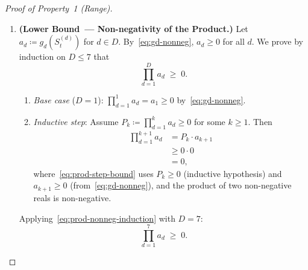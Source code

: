 \documentclass[12pt,openany]{book}
\numberwithin{equation}{chapter}
\theoremstyle{plain}
\theoremstyle{definition}
\theoremstyle{remark}
\def\mathcal#1{#1}%
\begin{document}
\begin{proof}[Proof of Property~1 (Range)]
\begin{enumerate}
  \item \textbf{(Lower Bound~--- Non-negativity of the Product.)}
        Let $a_d \coloneqq
          g_d\!\left(\mathcal{S}_t^{(d)}\right)$
        for $d \in \mathcal{D}$.
        By~\eqref{eq:gd-nonneg}, $a_d \geq 0$ for all $d$.
        We prove by induction on $D \leq 7$ that
        \begin{equation}
          \prod_{d=1}^{D} a_d \;\geq\; 0.
          \label{eq:prod-nonneg-induction}
        \end{equation}
        \begin{enumerate}
          \item \emph{Base case} ($D = 1$):
                $\prod_{d=1}^{1} a_d = a_1 \geq 0$
                by~\eqref{eq:gd-nonneg}.
          \item \emph{Inductive step}: Assume
                $P_k \coloneqq \prod_{d=1}^{k} a_d \geq 0$
                for some $k \geq 1$.
                Then
                \begin{align}
                  \prod_{d=1}^{k+1} a_d
                    &= P_k \cdot a_{k+1}
                    \label{eq:prod-step} \\
                    &\geq 0 \cdot 0
                    \label{eq:prod-step-bound} \\
                    &= 0,
                    \label{eq:prod-step-zero}
                \end{align}
                where~\eqref{eq:prod-step-bound} uses
                $P_k \geq 0$ (inductive hypothesis) and
                $a_{k+1} \geq 0$ (from~\eqref{eq:gd-nonneg}),
                and the product of two non-negative reals is
                non-negative.
        \end{enumerate}
        Applying~\eqref{eq:prod-nonneg-induction} with $D=7$:
        \begin{equation}
          \prod_{d=1}^{7} a_d \;\geq\; 0.
          \label{eq:prod-nonneg}
        \end{equation}


\end{enumerate}
\end{proof}
\end{document}
